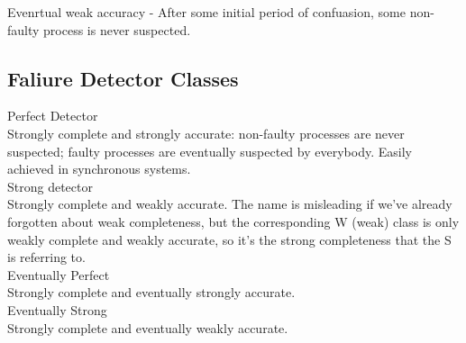 \documentclass{article}
\begin{document}
Evenrtual weak accuracy - After some initial period of confuasion, some non-faulty process is never suspected.

\subsection{Faliure Detector Classes}

Perfect Detector\\
    Strongly complete and strongly accurate: non-faulty processes are never suspected; faulty processes are eventually suspected by everybody. Easily achieved in synchronous systems.\\ 
    
Strong detector\\
    Strongly complete and weakly accurate. The name is misleading if we've already forgotten about weak completeness, but the corresponding W (weak) class is only weakly complete and weakly accurate, so it's the strong completeness that the S is referring to. \\
    
Eventually Perfect\\
    Strongly complete and eventually strongly accurate. \\
    
Eventually Strong\\
    Strongly complete and eventually weakly accurate.\\

\newpage




\end{document}
